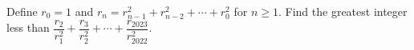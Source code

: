 Define $r_0=1$ and $r_n=r_{n-1}^2+r_{n-2}^2+\cdots+r_0^2$ for $n\ge1$. Find the greatest integer less than $\dfrac{r_2}{r_1^2}+\dfrac{r_3}{r_2^2}+\cdots+\dfrac{r_{2023}}{r_{2022}^2}$.
